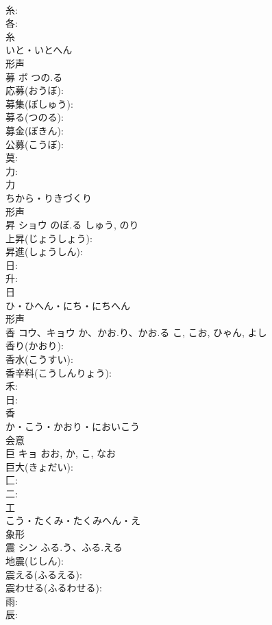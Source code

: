 \documentclass[8pt]{extreport}
\begin{document}
\begin{CJK}{UTF8}{min}
\\	糸: 
\\	各: 
\\	糸	
\\	いと・いとへん	
\\	形声 
\\	募	ボ	つの.る		
\\	応募(おうぼ): 
\\	募集(ぼしゅう): 
\\	募る(つのる): 
\\	募金(ぼきん): 
\\	公募(こうぼ): 
\\	莫: 
\\	力: 
\\	力	
\\	ちから・りきづくり	
\\	形声 
\\	昇	ショウ	のぼ.る	しゅう, のり	
\\	上昇(じょうしょう): 
\\	昇進(しょうしん): 
\\	日: 
\\	升: 
\\	日	
\\	ひ・ひへん・にち・にちへん	
\\	形声 
\\	香	コウ、キョウ	か、かお.り、かお.る	こ, こお, ひゃん, よし	
\\	香り(かおり): 
\\	香水(こうすい): 
\\	香辛料(こうしんりょう): 
\\	禾: 
\\	日: 
\\	香	
\\	か・こう・かおり・においこう	
\\	会意 
\\	巨	キョ		おお, か, こ, なお	
\\	巨大(きょだい): 
\\	匚: 
\\	二: 
\\	工	
\\	こう・たくみ・たくみへん・え	
\\	象形 
\\	震	シン	ふる.う、ふる.える		
\\	地震(じしん): 
\\	震える(ふるえる): 
\\	震わせる(ふるわせる): 
\\	雨: 
\\	辰: 

\end{CJK}
\end{document}
